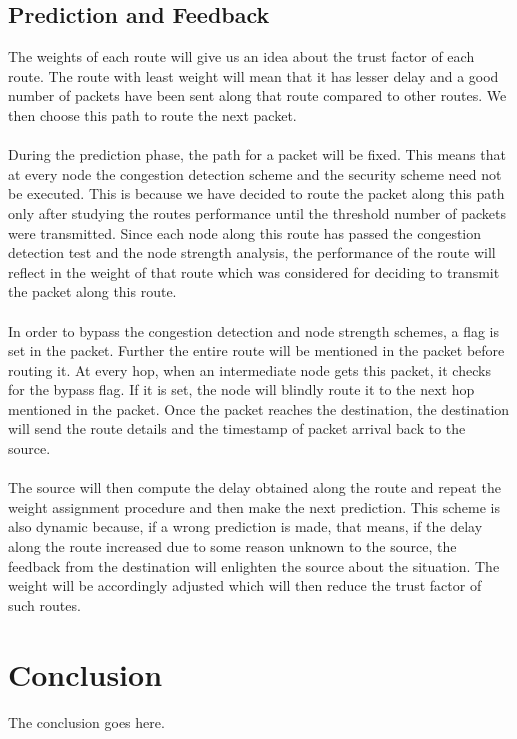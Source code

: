 \documentclass[journal]{IEEEtran}
\begin{document}
\subsection{Prediction and Feedback}
The weights of each route will give us an idea about the trust factor of each route. The route with least weight will mean that it has lesser delay and a good number of packets have been sent along that route compared to other routes. We then choose this path to route the next packet. \\ \\
\indent During the prediction phase, the path for a packet will be fixed. This means that at every node the congestion detection scheme and the security scheme need not be executed. This is because we have decided to route the packet along this path only after studying the routes performance until the threshold number of packets were transmitted. Since each node along this route has passed the congestion detection test and the node strength analysis, the performance of the route will reflect in the weight of that route which was considered for deciding to transmit the packet along this route. \\ \\
\indent In order to bypass the congestion detection and node strength schemes, a flag is set in the packet. Further the entire route will be mentioned in the packet before routing it. At every hop, when an intermediate node gets this packet, it checks for the bypass flag. If it is set, the node will blindly route it to the next hop mentioned in the packet. Once the packet reaches the destination, the destination will send the route details and the timestamp of packet arrival back to the source. \\ \\
\indent The source will then compute the delay obtained along the route and repeat the weight assignment procedure and then make the next prediction. This scheme is also dynamic because, if a wrong prediction is made, that means, if the delay along the route increased due to some reason unknown to the source, the feedback from the destination will enlighten the source about the situation. The weight will be accordingly adjusted which will then reduce the trust factor of such routes.

\section{Conclusion}
The conclusion goes here.
\end{document}
